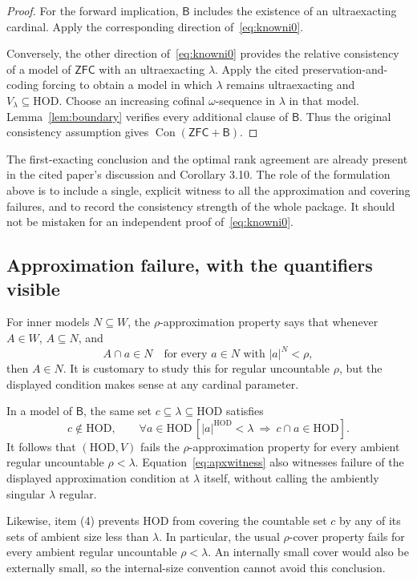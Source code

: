 \documentclass[11pt,letterpaper]{article}
\theoremstyle{definition}
\newcommand{\ZFC}{\mathsf{ZFC}}
\newcommand{\HOD}{\mathrm{HOD}}
\newcommand{\Con}{\operatorname{Con}}
\newcommand{\Bdry}{\mathsf{B}}
\begin{document}
\begin{proof}
For the forward implication, $\Bdry$ includes the existence of an ultraexacting
cardinal. Apply the corresponding direction of~\eqref{eq:knowni0}.

Conversely, the other direction of~\eqref{eq:knowni0} provides the relative
consistency of a model of $\ZFC$ with an ultraexacting $\lambda$.
Apply the cited preservation-and-coding forcing to obtain a model in which
$\lambda$ remains ultraexacting and $V_\lambda\subseteq\HOD$.
Choose an increasing cofinal $\omega$-sequence in $\lambda$ in that model.
Lemma~\ref{lem:boundary} verifies every additional clause of $\Bdry$.
Thus the original consistency assumption gives $\Con(\ZFC+\Bdry)$.
\end{proof}

The first-exacting conclusion and the optimal rank agreement are already
present in the cited paper's discussion and Corollary 3.10. \cite{abgl}
The role of the formulation above is to include a single, explicit witness
to all the approximation and covering failures, and to record the
consistency strength of the whole package. It should not be mistaken for an
independent proof of~\eqref{eq:knowni0}.

\subsection{Approximation failure, with the quantifiers visible}

For inner models $N\subseteq W$, the $\rho$-approximation property says that
whenever $A\in W$, $A\subseteq N$, and
\[
 A\cap a\in N\quad\text{for every }a\in N\text{ with }|a|^N<\rho,
\]
then $A\in N$. It is customary to study this for regular uncountable
$\rho$, but the displayed condition makes sense at any cardinal parameter.

In a model of $\Bdry$, the same set $c\subseteq\lambda\subseteq\HOD$ satisfies
\begin{equation}\label{eq:apxwitness}
 c\notin\HOD,\qquad
 \forall a\in\HOD\,
 [|a|^{\HOD}<\lambda\ \Longrightarrow\ c\cap a\in\HOD].
\end{equation}
It follows that $(\HOD,V)$ fails the $\rho$-approximation property for every
ambient regular uncountable $\rho<\lambda$. Equation~\eqref{eq:apxwitness}
also witnesses failure of the displayed approximation condition at $\lambda$
itself, without calling the ambiently singular $\lambda$ regular.

Likewise, item (4) prevents HOD from covering the countable set $c$ by any
of its sets of ambient size less than $\lambda$. In particular, the usual
$\rho$-cover property fails for every ambient regular uncountable
$\rho<\lambda$. An internally small cover would also be externally small,
so the internal-size convention cannot avoid this conclusion.
\end{document}

